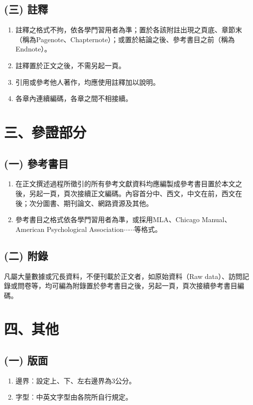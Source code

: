 \subsection{(三) 註釋}
\begin{enumerate}
    \item 註釋之格式不拘，依各學門習用者為準；置於各該附註出現之頁底、章節末（稱為Pagenote、Chapternote）；或置於結論之後、參考書目之前（稱為Endnote）。
    \item 註釋置於正文之後，不需另起一頁。
    \item 引用或參考他人著作，均應使用註釋加以說明。
    \item 各章內連續編碼，各章之間不相接續。
\end{enumerate}

\section{三、參證部分}
\subsection{(一) 參考書目}
\begin{enumerate}
    \item 在正文撰述過程所徵引的所有參考文獻資料均應編製成參考書目置於本文之後，另起一頁，頁次接續正文編碼。內容首分中、西文，中文在前，西文在後；次分圖書、期刊論文、網路資源及其他。
    \item 參考書目之格式依各學門習用者為準，或採用MLA、Chicago Manual、American Psychological Association$\cdots\cdots$等格式。
\end{enumerate}

\subsection{(二) 附錄}
     凡屬大量數據或冗長資料，不便刊載於正文者，如原始資料（Raw data）、訪問記錄或問卷等，均可編為附錄置於參考書目之後，另起一頁，頁次接續參考書目編碼。

\section{四、其他}
\subsection{(一) 版面}
\begin{enumerate}
    \item 邊界︰設定上、下、左右邊界為3公分。
    \item 字型︰中英文字型由各院所自行規定。
\end{enumerate}

